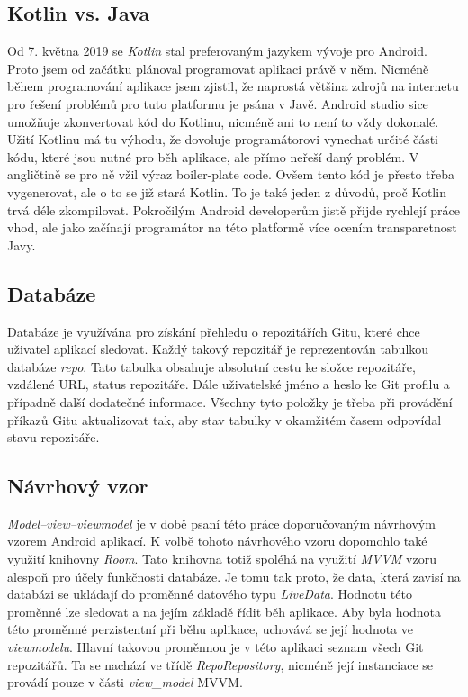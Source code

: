         \subsection{Kotlin vs. Java}
        Od 7. května 2019 se \emph{Kotlin} stal preferovaným jazykem vývoje pro Android. Proto jsem od začátku plánoval programovat aplikaci právě v něm. Nicméně během programování aplikace jsem zjistil, že naprostá většina zdrojů na internetu pro řešení problémů pro tuto platformu je psána v Javě. Android studio sice umožňuje zkonvertovat kód do Kotlinu, nicméně ani to není to vždy dokonalé. Užití Kotlinu má tu výhodu, že dovoluje programátorovi vynechat určité části kódu, které jsou nutné pro běh aplikace, ale přímo neřeší daný problém. V angličtině se pro ně vžil výraz boiler-plate code. Ovšem tento kód je přesto třeba vygenerovat, ale o to se již stará Kotlin. To je také jeden z důvodů, proč Kotlin trvá déle zkompilovat. Pokročilým Android developerům jistě přijde rychlejí práce vhod, ale jako začínají programátor na této platformě více ocením transparetnost Javy.    

        \subsection{Databáze}
        Databáze je využívána pro získání přehledu o repozitářích Gitu, které chce uživatel aplikací sledovat. Každý takový repozitář je reprezentován tabulkou databáze \emph{repo}. Tato tabulka obsahuje absolutní cestu ke složce repozitáře, vzdálené URL, status repozitáře. Dále uživatelské jméno a heslo ke Git profilu a případně další dodatečné informace. Všechny tyto položky je třeba při provádění příkazů Gitu aktualizovat tak, aby stav tabulky v okamžitém časem odpovídal stavu repozitáře.

        \subsection{Návrhový vzor}
        \emph{Model–view–viewmodel} je v době psaní této práce doporučovaným návrhovým vzorem Android aplikací. K volbě tohoto návrhového vzoru dopomohlo také využití knihovny \emph{Room}. Tato knihovna totiž spoléhá na využití \emph{MVVM} vzoru alespoň pro účely funkčnosti databáze. Je tomu tak proto, že data, která zavisí na databázi se ukládají do proměnné datového typu \emph{LiveData}. Hodnotu této proměnné lze sledovat a na jejím základě řídit běh aplikace. Aby byla hodnota této proměnné perzistentní při běhu aplikace, uchovává se její hodnota ve \emph{viewmodelu}. Hlavní takovou proměnnou je v této aplikaci seznam všech Git repozitářů. Ta se nachází ve třídě \emph{RepoRepository}, nicméně její instanciace se provádí pouze v části \emph{view\_model} MVVM.

